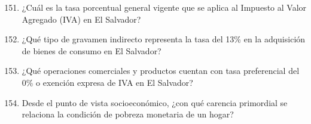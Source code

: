 \documentclass[10pt,a4paper]{article}
\begin{document}
\begin{enumerate}[label=\textbf{\arabic*.}]
\setcounter{enumi}{150}
\item ¿Cuál es la tasa porcentual general vigente que se aplica al Impuesto al Valor Agregado (IVA) en El Salvador?
\begin{enumerate}[label=\textbf{\Alph*)}]
\end{enumerate}
\vspace{0.15cm}
\item ¿Qué tipo de gravamen indirecto representa la tasa del 13\% en la adquisición de bienes de consumo en El Salvador?
\begin{enumerate}[label=\textbf{\Alph*)}]
\end{enumerate}
\vspace{0.15cm}
\item ¿Qué operaciones comerciales y productos cuentan con tasa preferencial del 0\% o exención expresa de IVA en El Salvador?
\begin{enumerate}[label=\textbf{\Alph*)}]
\end{enumerate}
\vspace{0.15cm}
\item Desde el punto de vista socioeconómico, ¿con qué carencia primordial se relaciona la condición de pobreza monetaria de un hogar?
\begin{enumerate}[label=\textbf{\Alph*)}]

\end{enumerate}
\end{enumerate}
\end{document}

